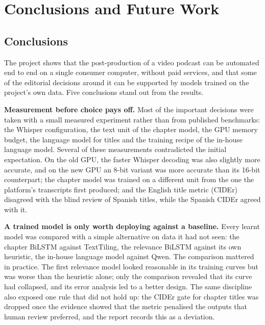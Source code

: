 \chapter{Conclusions and Future Work}
\label{ch:conclusions}

\section{Conclusions}

The project shows that the post-production of a video podcast can be automated end to end on a single consumer computer, without paid services, and that some of the editorial decisions around it can be supported by models trained on the project's own data. Five conclusions stand out from the results.

\textbf{Measurement before choice pays off.} Most of the important decisions were taken with a small measured experiment rather than from published benchmarks: the Whisper configuration, the text unit of the chapter model, the GPU memory budget, the language model for titles and the training recipe of the in-house language model. Several of these measurements contradicted the initial expectation. On the old GPU, the faster Whisper decoding was also slightly more accurate, and on the new GPU an 8-bit variant was more accurate than its 16-bit counterpart; the chapter model was trained on a different unit from the one the platform's transcripts first produced; and the English title metric (CIDEr) disagreed with the blind review of Spanish titles, while the Spanish CIDEr agreed with it.

\textbf{A trained model is only worth deploying against a baseline.} Every learnt model was compared with a simple alternative on data it had not seen: the chapter BiLSTM against TextTiling, the relevance BiLSTM against its own heuristic, the in-house language model against Qwen. The comparison mattered in practice. The first relevance model looked reasonable in its training curves but was worse than the heuristic alone; only the comparison revealed that its curve had collapsed, and its error analysis led to a better design. The same discipline also exposed one rule that did not hold up: the CIDEr gate for chapter titles was dropped once the evidence showed that the metric penalised the outputs that human review preferred, and the report records this as a deviation.

